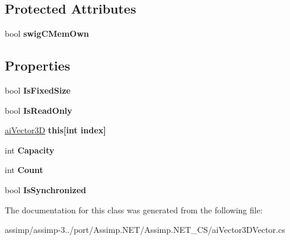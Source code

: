 \subsection*{Protected Attributes}
\begin{DoxyCompactItemize}
\item 
\hypertarget{classai_vector3_d_vector_aebade5cc92c7e9ac8befda10598020f2}{bool {\bfseries swig\+C\+Mem\+Own}}\label{classai_vector3_d_vector_aebade5cc92c7e9ac8befda10598020f2}

\end{DoxyCompactItemize}
\subsection*{Properties}
\begin{DoxyCompactItemize}
\item 
\hypertarget{classai_vector3_d_vector_a3638a0ae5cfa9052f6029c169eaf9f20}{bool {\bfseries Is\+Fixed\+Size}}\label{classai_vector3_d_vector_a3638a0ae5cfa9052f6029c169eaf9f20}

\item 
\hypertarget{classai_vector3_d_vector_a5863908f3c33d19345cb3d6921fca225}{bool {\bfseries Is\+Read\+Only}}\label{classai_vector3_d_vector_a5863908f3c33d19345cb3d6921fca225}

\item 
\hypertarget{classai_vector3_d_vector_ac87dfedc6cc8deb92d46ccce8c371157}{\hyperlink{structai_vector3_d}{ai\+Vector3\+D} {\bfseries this\mbox{[}int index\mbox{]}}}\label{classai_vector3_d_vector_ac87dfedc6cc8deb92d46ccce8c371157}

\item 
\hypertarget{classai_vector3_d_vector_a2bcff1cbb172055acf0daf08449ed1e0}{int {\bfseries Capacity}}\label{classai_vector3_d_vector_a2bcff1cbb172055acf0daf08449ed1e0}

\item 
\hypertarget{classai_vector3_d_vector_a738ca87a0b8b2087c61b530b9dd40950}{int {\bfseries Count}}\label{classai_vector3_d_vector_a738ca87a0b8b2087c61b530b9dd40950}

\item 
\hypertarget{classai_vector3_d_vector_ab403c8479dc9985bf4162569d17cfd6f}{bool {\bfseries Is\+Synchronized}}\label{classai_vector3_d_vector_ab403c8479dc9985bf4162569d17cfd6f}

\end{DoxyCompactItemize}


The documentation for this class was generated from the following file\+:\begin{DoxyCompactItemize}
\item 
assimp/assimp-\/3../port/\+Assimp.\+N\+E\+T/\+Assimp.\+N\+E\+T\+\_\+\+C\+S/ai\+Vector3\+D\+Vector.\+cs\end{DoxyCompactItemize}

